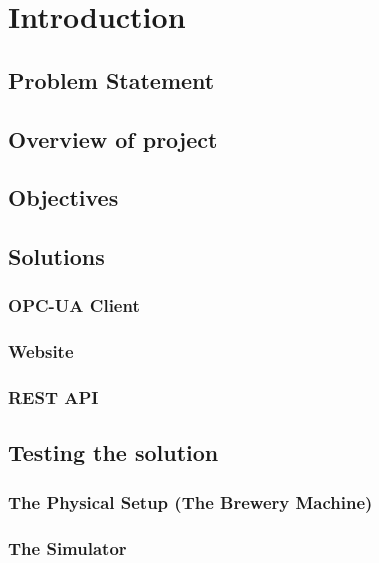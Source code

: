 \section{Introduction}
\subsection{Problem Statement}
\subsection{Overview of project}
\subsection{Objectives}
\subsection{Solutions}
\subsubsection{OPC-UA Client}
\subsubsection{Website}
\subsubsection{REST API}
\subsection{Testing the solution}
\subsubsection{The Physical Setup (The Brewery Machine)}
\subsubsection{The Simulator}
